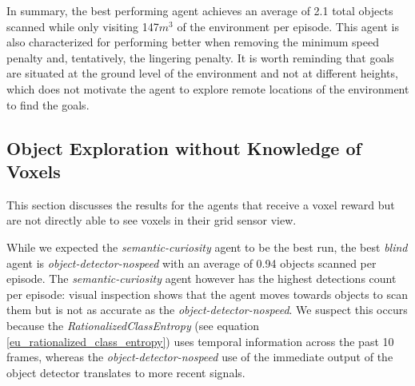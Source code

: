         
        
        
        In summary, the best performing agent achieves an average of 2.1 total objects scanned while only visiting 147$m^3$ of the environment per episode. This agent is also characterized for performing better when removing the minimum speed penalty and, tentatively, the lingering penalty. 
        It is worth reminding that goals are situated at the ground level of the environment and not at different heights, which does not motivate the agent to explore remote locations of the environment to find the goals. 
    
    
    

    \subsection{Object Exploration without Knowledge of Voxels}
        This section discusses the results for the agents that receive a voxel reward but are not directly able to see voxels in their grid sensor view.
        
         While we expected the \textit{semantic-curiosity} agent to be the best run, the best \textit{blind} agent is \textit{object-detector-nospeed} with an average of 0.94 objects scanned per episode. The \textit{semantic-curiosity} agent however has the highest detections count per episode: visual inspection shows that the agent moves towards objects to scan them but is not as accurate as the \textit{object-detector-nospeed}. We suspect this occurs because the \textit{RationalizedClassEntropy} (see equation \ref{eu_rationalized_class_entropy}) uses temporal information across the past 10 frames, whereas the \textit{object-detector-nospeed} use of the immediate output of the object detector translates to more recent signals.
        
